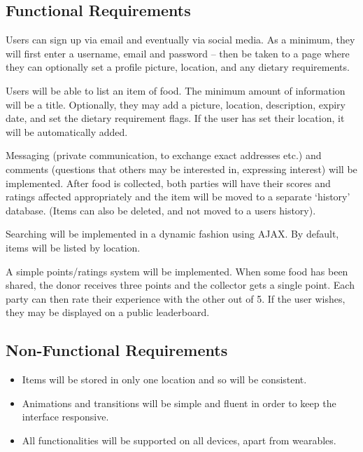 \documentclass[12pt]{article}
\begin{document}
\subsection{Functional Requirements}
Users can sign up via email and eventually via social media. As a minimum, they
will first enter a username, email and password – then be taken to a page where
they can optionally set a profile picture, location, and any dietary
requirements.

Users will be able to list an item of food. The minimum amount of information
will be a title. Optionally, they may add a picture, location, description,
expiry date, and set the dietary requirement flags. If the user has set their
location, it will be automatically added.

Messaging (private communication, to exchange exact addresses etc.) and
comments (questions that others may be interested in, expressing interest)
will be implemented.
After food is collected, both parties will have their
scores and ratings affected appropriately and the item will be moved to a
separate ‘history’ database.
(Items can also be deleted, and not moved to a users history).

Searching will be implemented in a dynamic fashion using AJAX. By default,
items will be listed by location.

A simple points/ratings system will be implemented. When some food has been
shared, the donor receives three points and the collector gets a single point.
Each party can then rate their experience with the other out of 5.
If the user wishes, they may be displayed on a public leaderboard.


\subsection{Non-Functional Requirements}
\begin{itemize}
    \item Items will be stored in only one location and so will be consistent.
    \item Animations and transitions will be simple and fluent in order to keep
        the interface responsive.
    \item All functionalities will be supported on all devices, apart from
        wearables.
\end{itemize}
\end{document}
